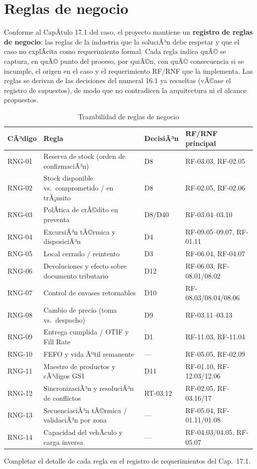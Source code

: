 \section{Reglas de negocio}

Conforme al CapÃ­tulo 17.1 del caso, el proyecto mantiene un \textbf{registro de reglas de
negocio}: las reglas de la industria que la soluciÃ³n debe respetar y que el caso no
explÃ­cita como requerimiento formal. Cada regla indica quÃ© se captura, en quÃ© punto del
proceso, por quiÃ©n, con quÃ© consecuencia si se incumple, el origen en el caso y el
requerimiento RF/RNF que la implementa. Las reglas se derivan de las decisiones del
numeral 16.1 ya resueltas (vÃ©ase el registro de supuestos), de modo que no contradicen la
arquitectura ni el alcance propuestos.

\begin{table}[htbp]
\centering
\small
\caption{Trazabilidad de reglas de negocio}
\label{tab:reglas_resumen}
\begin{tabularx}{\textwidth}{@{}L{1.3cm}L{4.1cm}L{1.3cm}L{7.2cm}@{}}
\toprule
\textbf{CÃ³digo} & \textbf{Regla} & \textbf{DecisiÃ³n} & \textbf{RF/RNF principal} \\
\midrule
RNG-01 & Reserva de stock (orden de confirmaciÃ³n) & D8 & RF-03.03, RF-02.05 \\
RNG-02 & Stock disponible vs.\ comprometido / en trÃ¡nsito & D8 & RF-02.05, RF-02.06 \\
RNG-03 & PolÃ­tica de crÃ©dito en preventa & D8/D40 & RF-03.04--03.10 \\
RNG-04 & ExcursiÃ³n tÃ©rmica y disposiciÃ³n & D4 & RF-09.05--09.07, RF-01.11 \\
RNG-05 & Local cerrado / reintento & D3 & RF-06.04, RF-04.07 \\
RNG-06 & Devoluciones y efecto sobre documento tributario & D12 & RF-06.03, RF-08.01/08.02 \\
RNG-07 & Control de envases retornables & D10 & RF-08.03/08.04/08.06 \\
RNG-08 & Cambio de precio (toma vs.\ despacho) & D9 & RF-03.11--03.13 \\
RNG-09 & Entrega cumplida / OTIF y Fill Rate & D1 & RF-11.03, RF-11.04 \\
RNG-10 & FEFO y vida Ãºtil remanente & --- & RF-05.05, RF-02.09 \\
RNG-11 & Maestro de productos y cÃ³digos GS1 & D11 & RF-01.10, RF-12.03/12.06 \\
RNG-12 & SincronizaciÃ³n y resoluciÃ³n de conflictos & RT-03.12 & RF-02.05, RF-03.16/17 \\
RNG-13 & SecuenciaciÃ³n tÃ©rmica / validaciÃ³n por zona & --- & RF-05.04, RF-01.11/01.08 \\
RNG-14 & Capacidad del vehÃ­culo y carga inversa & --- & RF-04.03/04.05, RF-05.07 \\
\bottomrule
\end{tabularx}
\vspace{4pt}
{\small\color{lafroxGrato}\pendiente{} Completar el detalle de cada regla en el
registro de requerimientos del Cap.\ 17.1.}
\end{table}

